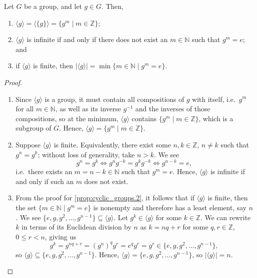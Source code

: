 \begin{prop}
Let $ G $ be a group, and let $ g\in G $. Then,
\begin{enumerate}
    \item $ \langle g\rangle=\langle\{g\}\rangle=\{g^m\mid m\in\mathbb{Z}\} $;
    \item $ \langle g\rangle $ is infinite if and only if there does not exist an $ m\in\mathbb{N} $ such that $ g^m=e $; and \label{prop:cyclic_groups.2}
    \item if $ \langle g\rangle $ is finite, then $ \lvert\langle g\rangle\rvert=\min\{m\in\mathbb{N}\mid g^m=e\} $.
\end{enumerate}
\end{prop}
\begin{proof}~
\begin{enumerate}

\item Since $ \langle g\rangle $ is a group, it must contain all compositions of $ g $ with itself, i.e.\ $ g^m $ for all $ m\in\mathbb{N} $, as well as its inverse $ g^{-1} $ and the inverses of those compositions, so at the minimum, $ \langle g\rangle $ contains $ \{g^m\mid m\in\mathbb{Z}\} $, which is a subgroup of $ G $. Hence, $ \langle g\rangle=\{g^m\mid m\in\mathbb{Z}\} $.

\item Suppose $ \langle g\rangle $ is finite. Equivalently, there exist some $ n,k\in\mathbb{Z} $, $ n\neq k $ such that $ g^n=g^k $; without loss of generality, take $ n>k $. We see
\begin{equation*}
    g^n=g^k \iff g^ng^{-k}=g^kg^{-k} \iff g^{n-k}=e,
\end{equation*}
i.e.\ there exists an $ m=n-k\in\mathbb{N} $ such that $ g^m=e $. Hence, $ \langle g\rangle $ is infinite if and only if such an $ m $ does not exist.

\item From the proof for \ref{prop:cyclic_groups.2}, it follows that if $ \langle g\rangle $ is finite, then the set $ \{m\in\mathbb{N}\mid g^m=e\} $ is nonempty and therefore has a least element, say $ n $. We see $ \{e,g,g^2,\ldots,g^{n-1}\}\subseteq\langle g\rangle $. Let $ g^k\in\langle g\rangle $ for some $ k\in\mathbb{Z} $. We can rewrite $ k $ in terms of its Euclidean division by $ n $ as $ k=nq+r $ for some $ q,r\in\mathbb{Z} $, $ 0\leq r<n $, giving us
\begin{equation*}
    g^k=g^{nq+r}=(g^n)^qg^r=e^qg^r=g^r\in\{e,g,g^2,\ldots,g^{n-1}\},
\end{equation*}
so $ \langle g\rangle\subseteq\{e,g,g^2,\ldots,g^{n-1}\} $. Hence, $ \langle g\rangle=\{e,g,g^2,\ldots,g^{n-1}\} $, so $ \lvert\langle g\rangle\rvert=n $.\qedhere
    
\end{enumerate}
\end{proof}

